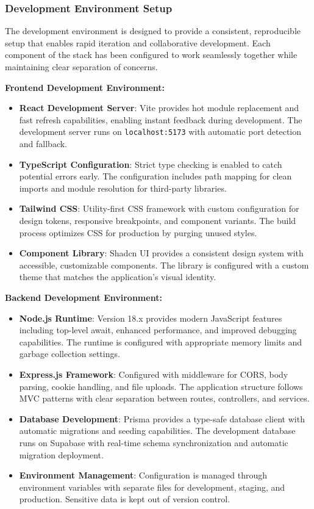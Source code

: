 \documentclass[12pt,a4paper]{article}
\begin{document}
\subsubsection{Development Environment Setup}

The development environment is designed to provide a consistent, reproducible setup that enables rapid iteration and collaborative development. Each component of the stack has been configured to work seamlessly together while maintaining clear separation of concerns.

\textbf{Frontend Development Environment:}
\begin{itemize}
  \item \textbf{React Development Server}: Vite provides hot module replacement and fast refresh capabilities, enabling instant feedback during development. The development server runs on \texttt{localhost:5173} with automatic port detection and fallback.
  \item \textbf{TypeScript Configuration}: Strict type checking is enabled to catch potential errors early. The configuration includes path mapping for clean imports and module resolution for third-party libraries.
  \item \textbf{Tailwind CSS}: Utility-first CSS framework with custom configuration for design tokens, responsive breakpoints, and component variants. The build process optimizes CSS for production by purging unused styles.
  \item \textbf{Component Library}: Shadcn UI provides a consistent design system with accessible, customizable components. The library is configured with a custom theme that matches the application's visual identity.
\end{itemize}

\textbf{Backend Development Environment:}
\begin{itemize}
  \item \textbf{Node.js Runtime}: Version 18.x provides modern JavaScript features including top-level await, enhanced performance, and improved debugging capabilities. The runtime is configured with appropriate memory limits and garbage collection settings.
  \item \textbf{Express.js Framework}: Configured with middleware for CORS, body parsing, cookie handling, and file uploads. The application structure follows MVC patterns with clear separation between routes, controllers, and services.
  \item \textbf{Database Development}: Prisma provides a type-safe database client with automatic migrations and seeding capabilities. The development database runs on Supabase with real-time schema synchronization and automatic migration deployment.
  \item \textbf{Environment Management}: Configuration is managed through environment variables with separate files for development, staging, and production. Sensitive data is kept out of version control.
\end{itemize}
\end{document}
